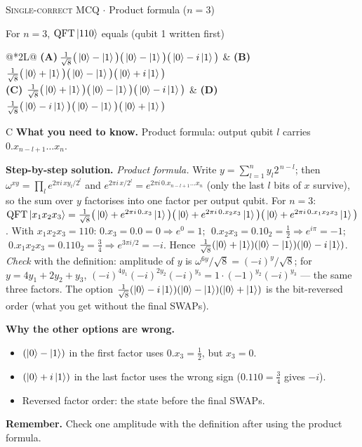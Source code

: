 \documentclass[11pt,a4paper]{article}
\newcommand{\optlabel}[1]{\textbf{(#1)}}
\newcommand{\correctlabel}[1]{\textcolor{okgreen}{\textbf{(#1)}\,\ding{51}}}
\newenvironment{qitem}[1]{\begin{list}{}{\setlength{\leftmargin}{3.3em}\setlength{\labelwidth}{3.1em}%
  \setlength{\labelsep}{0.2em}\setlength{\topsep}{3pt}\setlength{\parsep}{3pt}}\item[\textbf{Q.#1}\hfill]}{\end{list}}
\newcommand{\qsep}{\par\vspace{2pt}{\color{black!15}\hrule}\vspace{4pt}}
\newcommand{\qmeta}[2]{{\footnotesize\color{black!60}\textsc{#1} \;$\cdot$\; #2}\par}
\begin{document}
\begin{qitem}{43}
\qmeta{Single-correct MCQ}{Product formula ($n = 3$)}
For $n = 3$, $\mathrm{QFT}\ket{110}$ equals (qubit 1 written first)
\par\smallskip\noindent\begin{tabularx}{\linewidth}{@{}*{2}{L}@{}}
\optlabel{A}\,$\frac{1}{\sqrt8}\big(\ket0 - \ket1\big)\big(\ket0 - \ket1\big)\big(\ket0 - i\ket1\big)$ & \optlabel{B}\,$\frac{1}{\sqrt8}\big(\ket0 + \ket1\big)\big(\ket0 - \ket1\big)\big(\ket0 + i\ket1\big)$ \\[3pt]
\correctlabel{C}\,$\frac{1}{\sqrt8}\big(\ket0 + \ket1\big)\big(\ket0 - \ket1\big)\big(\ket0 - i\ket1\big)$ & \optlabel{D}\,$\frac{1}{\sqrt8}\big(\ket0 - i\ket1\big)\big(\ket0 - \ket1\big)\big(\ket0 + \ket1\big)$
\end{tabularx}
\end{qitem}
\begin{solbox}{C}
\textbf{\color{brand}What you need to know.} Product formula: output qubit $l$ carries $0.x_{n-l+1}\dots x_n$.

\textbf{\color{brand}Step-by-step solution.} \emph{Product formula.} Write $y = \sum_{l=1}^{n} y_l 2^{\,n-l}$; then $\omega^{xy} = \prod_{l}e^{2\pi i\,x y_l/2^{l}}$ and
$e^{2\pi i\,x/2^l} = e^{2\pi i\,0.x_{n-l+1}\dots x_n}$ (only the last $l$ bits of $x$ survive), so the sum over $y$ factorises into one
factor per output qubit. For $n = 3$: $\mathrm{QFT}\ket{x_1x_2x_3} = \frac{1}{\sqrt8}
\big(\ket0 + e^{2\pi i\,0.x_3}\ket1\big)\big(\ket0 + e^{2\pi i\,0.x_2x_3}\ket1\big)\big(\ket0 + e^{2\pi i\,0.x_1x_2x_3}\ket1\big)$.
With $x_1x_2x_3 = 110$: $0.x_3 = 0.0 = 0 \Rightarrow e^{0} = 1$; $\;0.x_2x_3 = 0.10_2 = \frac12 \Rightarrow e^{i\pi} = -1$;
$\;0.x_1x_2x_3 = 0.110_2 = \frac34 \Rightarrow e^{3\pi i/2} = -i$. Hence
$\frac{1}{\sqrt8}(\ket0 + \ket1)(\ket0 - \ket1)(\ket0 - i\ket1)$.
\emph{Check} with the definition: amplitude of $y$ is $\omega^{6y}/\sqrt8 = (-i)^{y}/\sqrt8$; for $y = 4y_1 + 2y_2 + y_3$,
$(-i)^{4y_1}(-i)^{2y_2}(-i)^{y_3} = 1\cdot(-1)^{y_2}(-i)^{y_3}$ --- the same three factors. The option
$\frac{1}{\sqrt8}(\ket0 - i\ket1)(\ket0 - \ket1)(\ket0 + \ket1)$ is the bit-reversed order (what you get without the final SWAPs).

\textbf{\color{brand}Why the other options are wrong.}
\begin{itemize}[leftmargin=2.4em, itemsep=1pt, topsep=2pt]
\item[\textbf{(A)}] $(\ket0 - \ket1)$ in the first factor uses $0.x_3 = \frac12$, but $x_3 = 0$.
\item[\textbf{(B)}] $(\ket0 + i\ket1)$ in the last factor uses the wrong sign ($0.110 = \frac34$ gives $-i$).
\item[\textbf{(D)}] Reversed factor order: the state before the final SWAPs.
\end{itemize}
\textbf{\color{brand}Remember.} Check one amplitude with the definition after using the product formula.
\end{solbox}
\qsep
\end{document}

